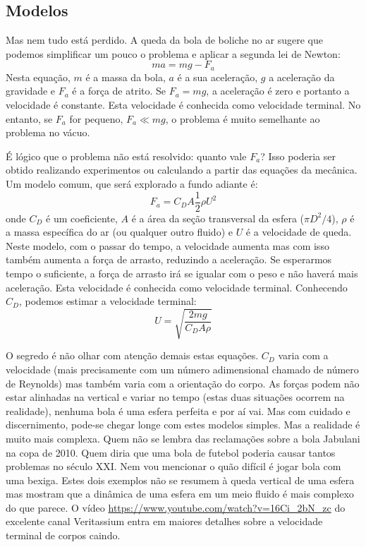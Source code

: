 \documentclass[article,12pt,oneside,a4paper,english,brazil,sumario=tradicional]{abntex2}
\begin{document}
\subsection{Modelos}

Mas nem tudo está perdido. A queda da bola de boliche no ar sugere que podemos simplificar um pouco o problema e aplicar a segunda lei de Newton:
\[
m a = m g - F_a
\]
Nesta equação, $m$ é a massa da bola, $a$ é a sua aceleração, $g$ a aceleração da gravidade e $F_a$ é a força de atrito. Se $F_a = m g$, a aceleração é zero e portanto a velocidade é constante. Esta velocidade é conhecida como velocidade terminal. No entanto, se $F_a$ for pequeno, $F_a \ll mg$, o problema é muito semelhante ao problema no vácuo. 

É lógico que o problema não está resolvido: quanto vale $F_a$? Isso poderia ser obtido realizando experimentos ou calculando a partir das equações da mecânica. Um modelo comum, que será explorado a fundo adiante é:
\[
F_a = C_D A \frac{1}{2}\rho U^2
\]
onde $C_D$ é um coeficiente, $A$ é a área da seção transversal da esfera ($\pi D^2 /4$), $\rho$ é a massa específica do ar (ou qualquer outro fluido) e $U$ é a velocidade de queda. Neste modelo, com o passar do tempo, a velocidade aumenta mas com isso também aumenta a força de arrasto, reduzindo a aceleração. Se esperarmos tempo o suficiente, a força de arrasto irá se igualar com o peso e não haverá mais aceleração. Esta velocidade é conhecida como velocidade terminal. Conhecendo $C_D$, podemos estimar a velocidade terminal:
\[
U = \sqrt{\frac{2 m g}{C_D A \rho}}
\]

O segredo é não olhar com atenção demais estas equações. $C_D$ varia com a velocidade (mais precisamente com um número adimensional chamado de número de Reynolds) mas também varia com a orientação do corpo. As forças podem não estar alinhadas na vertical e variar no tempo (estas duas situações ocorrem na realidade), nenhuma bola é uma esfera perfeita  e por aí vai. Mas com cuidado e discernimento, pode-se chegar longe com estes modelos simples. Mas a realidade é muito mais complexa. Quem não se lembra das reclamações sobre a bola Jabulani na copa de 2010. Quem diria que uma bola de futebol poderia causar tantos problemas no século XXI. Nem vou mencionar o quão difícil é jogar bola com uma bexiga. Estes dois exemplos não se resumem à queda vertical de uma esfera mas mostram que a dinâmica de uma esfera em um meio fluido é mais complexo do que parece. O vídeo \url{https://www.youtube.com/watch?v=16Ci_2bN_zc} do excelente canal Veritassium entra em maiores detalhes sobre a velocidade terminal de corpos caindo.
\end{document}
